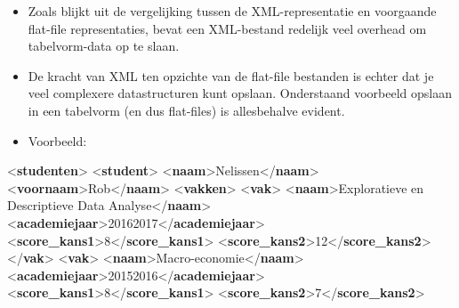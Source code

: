 \documentclass[]{tufte-book}
\newenvironment{Shaded}{}{}
\newcommand{\KeywordTok}[1]{\textcolor[rgb]{0.00,0.44,0.13}{\textbf{#1}}}
\newcommand{\NormalTok}[1]{#1}
\providecommand{\tightlist}{%
  \setlength{\itemsep}{0pt}\setlength{\parskip}{0pt}}
\begin{document}
\begin{itemize}
\tightlist
\item
  Zoals blijkt uit de vergelijking tussen de XML-representatie en voorgaande flat-file representaties, bevat een XML-bestand redelijk veel overhead om tabelvorm-data op te slaan.
\item
  De kracht van XML ten opzichte van de flat-file bestanden is echter dat je veel complexere datastructuren kunt opslaan. Onderstaand voorbeeld opslaan in een tabelvorm (en dus flat-files) is allesbehalve evident.
\item
  Voorbeeld:
\end{itemize}

\begin{Shaded}
\begin{Highlighting}[]
\NormalTok{\textless{}}\KeywordTok{studenten}\NormalTok{\textgreater{}}
\NormalTok{  \textless{}}\KeywordTok{student}\NormalTok{\textgreater{}}
\NormalTok{    \textless{}}\KeywordTok{naam}\NormalTok{\textgreater{}Nelissen\textless{}/}\KeywordTok{naam}\NormalTok{\textgreater{}}
\NormalTok{    \textless{}}\KeywordTok{voornaam}\NormalTok{\textgreater{}Rob\textless{}/}\KeywordTok{naam}\NormalTok{\textgreater{}}
\NormalTok{    \textless{}}\KeywordTok{vakken}\NormalTok{\textgreater{}}
\NormalTok{      \textless{}}\KeywordTok{vak}\NormalTok{\textgreater{}}
\NormalTok{        \textless{}}\KeywordTok{naam}\NormalTok{\textgreater{}Exploratieve en Descriptieve Data Analyse\textless{}/}\KeywordTok{naam}\NormalTok{\textgreater{}}
\NormalTok{        \textless{}}\KeywordTok{academiejaar}\NormalTok{\textgreater{}20162017\textless{}/}\KeywordTok{academiejaar}\NormalTok{\textgreater{}}
\NormalTok{        \textless{}}\KeywordTok{score\_kans1}\NormalTok{\textgreater{}8\textless{}/}\KeywordTok{score\_kans1}\NormalTok{\textgreater{}}
\NormalTok{        \textless{}}\KeywordTok{score\_kans2}\NormalTok{\textgreater{}12\textless{}/}\KeywordTok{score\_kans2}\NormalTok{\textgreater{}}
\NormalTok{      \textless{}/}\KeywordTok{vak}\NormalTok{\textgreater{}}
\NormalTok{      \textless{}}\KeywordTok{vak}\NormalTok{\textgreater{}}
\NormalTok{        \textless{}}\KeywordTok{naam}\NormalTok{\textgreater{}Macro{-}economie\textless{}/}\KeywordTok{naam}\NormalTok{\textgreater{}}
\NormalTok{        \textless{}}\KeywordTok{academiejaar}\NormalTok{\textgreater{}20152016\textless{}/}\KeywordTok{academiejaar}\NormalTok{\textgreater{}}
\NormalTok{        \textless{}}\KeywordTok{score\_kans1}\NormalTok{\textgreater{}8\textless{}/}\KeywordTok{score\_kans1}\NormalTok{\textgreater{}}
\NormalTok{        \textless{}}\KeywordTok{score\_kans2}\NormalTok{\textgreater{}7\textless{}/}\KeywordTok{score\_kans2}\NormalTok{\textgreater{}}

\end{Highlighting}
\end{Shaded}
\end{document}
